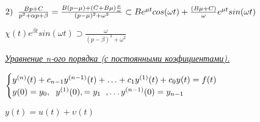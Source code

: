 \documentclass{article}
\begin{document}
\begin{large}
\begin{flushright}
\begin{Large}
\vspace{0.5cm}
\begin{LARGE}
$
2)\text{\hspace{0.2cm}} 
\frac{Bp + C}{p^2 + \alpha p + \beta}
= 
\frac{B(p-\mu) + ( C  + B\mu)\frac{\mu }{\omega}}{(p-\mu)^2 + \omega^2}
\subset
Be^{\mu t}cos(\omega t)
+
\frac{(B\mu + C)}{\omega}e^{\mu t}sin(\omega t)
$
\end{LARGE}



\end{Large}
\end{flushright}

\begin{Large}

\vspace{0.5cm}
$
\chi (t)e^{\beta t} sin(\omega t) 
\supset
\frac{\omega}{(p-\beta)^2 + \omega^2}
$


\end{Large}

\vspace{0.5cm}
\begin{LARGE}
\textit{\underline{Уравнение n-ого порядка (с постоянными коэфициентами).}}
\end{LARGE}

\vspace{0.5cm}
\begin{Large}
$
\begin{cases}
	y^{(n)}(t) + c_{n-1}y^{(n-1)}(t)+\ldots + c_1y^{(1)}(t) +c_0y(t) = f(t) \\
	y(0) = y_0, \text{\hspace{0.2cm}} y^{(1)}(0), = y_1 \text{\hspace{0.2cm}}, \ldots y^{(n-1)}(0) = y_{n-1}
\end{cases}
$


\vspace{0.5cm}
\begin{center}
$
y(t) = u(t) + \upsilon(t)
$
\end{center}


\end{Large}


\end{large}
\end{document}

